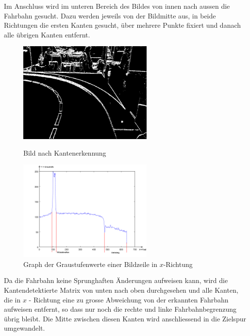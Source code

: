 Im Anschluss wird im unteren Bereich des Bildes von innen nach aussen die Fahrbahn gesucht. Dazu werden jeweils von der Bildmitte aus, in beide Richtungen die ersten Kanten gesucht, über mehrere Punkte fixiert und danach alle übrigen Kanten entfernt.\\
\begin{figure}[H]%
\centering
\includegraphics[width=0.6\textwidth]{03_Loesungskonzept/pictures/Kantengrafik.png}
\caption{Bild nach Kantenerkennung}
\includegraphics[width=0.6\textwidth]{03_Loesungskonzept/pictures/graphPicture.png}
\caption{Graph der Graustufenwerte einer Bildzeile in $x$-Richtung}
\label{fig:grayscale}
\end{figure}
Da die Fahrbahn keine Sprunghaften Änderungen aufweisen kann, wird die Kantendetektierte Matrix von unten nach oben durchgesehen und alle Kanten, die in $x$ - Richtung eine zu grosse Abweichung von der erkannten Fahrbahn aufweisen entfernt, so dass nur noch die rechte und linke Fahrbahnbegrenzung übrig bleibt. Die Mitte zwischen diesen Kanten wird anschliessend in die Zielspur umgewandelt.\\[0.2cm]
